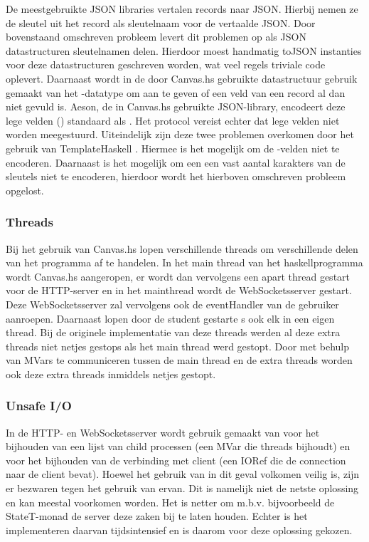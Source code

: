 De meestgebruikte JSON libraries vertalen records naar JSON. Hierbij nemen ze de sleutel uit het record als sleutelnaam voor de vertaalde JSON. Door bovenstaand omschreven probleem levert dit problemen op als JSON datastructuren sleutelnamen delen. Hierdoor moest handmatig toJSON instanties voor deze datastructuren geschreven worden, wat veel regels triviale code oplevert. Daarnaast wordt in de door Canvas.hs gebruikte datastructuur gebruik gemaakt van het -datatype om aan te geven of een veld van een record al dan niet gevuld is. Aeson, de in Canvas.hs gebruikte JSON-library, encodeert deze lege velden () standaard als . Het protocol vereist echter dat lege velden niet worden meegestuurd. Uiteindelijk zijn deze twee problemen overkomen door het gebruik van TemplateHaskell \cite{AesonTH}. Hiermee is het mogelijk om de -velden niet te encoderen. Daarnaast is het mogelijk om een een vast aantal karakters van de sleutels niet te encoderen, hierdoor wordt het hierboven omschreven probleem opgelost. 


\subsubsection{Threads}
Bij het gebruik van Canvas.hs lopen verschillende threads om verschillende delen van het programma af te handelen. In het main thread van het haskellprogramma wordt Canvas.hs aangeropen, er wordt dan vervolgens een apart thread gestart voor de HTTP-server en in het mainthread wordt de WebSocketsserver gestart. Deze WebSocketsserver zal vervolgens ook de eventHandler van de gebruiker aanroepen. Daarnaast lopen door de student gestarte s ook elk in een eigen thread. Bij de originele implementatie van deze threads werden al deze extra threads niet netjes gestops als het main thread werd gestopt. Door met behulp van MVars te communiceren tussen de main thread en de extra threads worden ook deze extra threads inmiddels netjes gestopt.

\subsubsection{Unsafe I/O}
In de HTTP- en WebSocketsserver wordt gebruik gemaakt van  voor het bijhouden van een lijst van child processen (een MVar die threads bijhoudt) en voor het bijhouden van de verbinding met client (een IORef die de connection naar de client bevat). Hoewel het gebruik van  in dit geval volkomen veilig is, zijn er bezwaren tegen het gebruik van ervan\cite{Haskell.org2008}. Dit is namelijk niet de netste oplossing en kan meestal voorkomen worden. Het is netter om m.b.v. bijvoorbeeld de StateT-monad de server deze zaken bij te laten houden. Echter is het implementeren daarvan tijdsintensief en is daarom voor deze oplossing gekozen.
